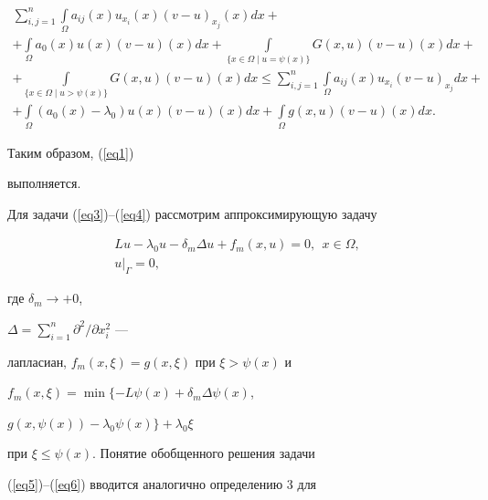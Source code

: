 \begin{pf}
\begin{gather*}
\sum_{i,j=1}^n\int\limits_{\Omega}a_{ij}(x)u_{x_i}(x)(v-u)_{x_j}(x)dx+\\


%


+\int\limits_{\Omega}a_0(x)u(x)(v-u)(x)dx+


\int\limits_{\{x\in\Omega\;| \;u=\psi(x)\}}G(x,u)(v-u)(x)dx+\\


%


+\int\limits_{\{x\in\Omega\;| \;u>\psi(x)\}}G(x,u)(v-u)(x)dx\le


\sum_{i,j=1}^n\int\limits_{\Omega}a_{ij}(x)u_{x_i}(v-u)_{x_j}dx+\\


%


+\int\limits_{\Omega}(a_0(x)-\lambda_0)u(x)(v-u)(x)dx+


\int\limits_{\Omega}g(x,u)(v-u)(x)dx.


\end{gather*}


Таким образом, (\ref{eq1})


выполняется.


\end{pf}








Для задачи (\ref{eq3})--(\ref{eq4}) рассмотрим аппроксимирующую задачу


\begin{gather}\label{eq5}


Lu-\lambda_0u-\delta_m\Delta u+f_m(x,u)=0,\ \ x\in\Omega,\\


%


\label{eq6}


u |_{\Gamma}=0,


\end{gather}


где $\delta_m\to +0$,


$\Delta=\sum\limits_{i=1}^n{\partial^2}/{\partial x_i^2}$ ---


лапласиан, $f_m(x,\xi)=g(x,\xi)$ при $\xi>\psi(x)$ и


$f_m(x,\xi)=\min\{-L\psi(x)+\delta_m\Delta\psi(x)$,


$g(x,\psi(x))-\lambda_0\psi(x)\}+\lambda_0\xi$


при $\xi\le\psi(x)$. Понятие обобщенного решения задачи


(\ref{eq5})--(\ref{eq6}) вводится аналогично определению 3 для



